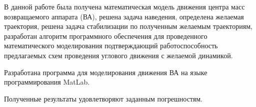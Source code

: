 В данной работе была получена математическая модель движения центра масс возвращаемого аппарата (ВА), решена задача наведения, определена желаемая траектория, решена задача стабилизации по полученным желаемым траекториям, разработан алгоритм программного обеспечения  для проведенного математического моделирования подтверждающий работоспособность предлагаемых схем проведения углового движения с желаемой динамикой.

Разработана программа для моделирования движения ВА на языке программирования MatLab.

Полученные результаты удовлетворяют заданным погрешностям.
\clearpage